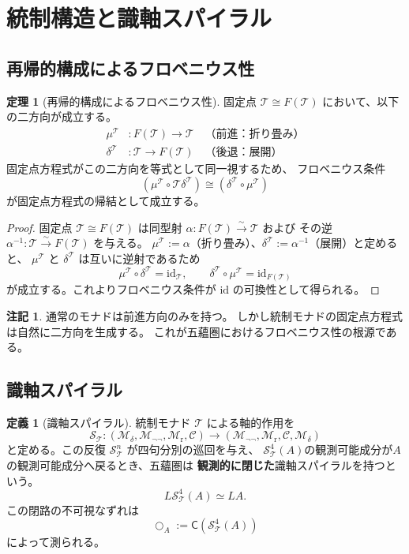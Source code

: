 \documentclass[11pt,a4paper]{ltjsarticle}
\theoremstyle{definition}
\newtheorem{definition}{定義}[section]
\newtheorem{theorem}{定理}[section]
\newtheorem{remark}{注記}[section]
\newcommand{\id}{\mathrm{id}}
\newcommand{\Mdelta}{\mathcal{M}_{\delta}}
\newcommand{\Mneg}{\mathcal{M}_{\neg\neg}}
\newcommand{\Mr}{\mathcal{M}_{\mathrm{r}}}
\newcommand{\Mc}{\mathcal{C}}
\newcommand{\T}{\mathcal{T}}
\newcommand{\SpiralT}{\mathcal{S}_{\mathcal{T}}}
\newcommand{\fold}{\mu}
\newcommand{\unfold}{\delta}
\newcommand{\Residual}{\mathsf{C}}
\begin{document}
\section{統制構造と識軸スパイラル}

\subsection{再帰的構成によるフロベニウス性}

\begin{theorem}[再帰的構成によるフロベニウス性]
固定点 $\T \cong F(\T)$ において、以下の二方向が成立する。
\begin{align}
\fold^\T &: F(\T) \to \T \quad \text{（前進：折り畳み）} \\
\unfold^\T &: \T \to F(\T) \quad \text{（後退：展開）}
\end{align}
固定点方程式がこの二方向を等式として同一視するため、
フロベニウス条件
\begin{equation}
(\fold^\T \circ \T\unfold^\T) \cong (\unfold^\T \circ \fold^\T)
\end{equation}
が固定点方程式の帰結として成立する。
\end{theorem}
\begin{proof}
固定点 $\T \cong F(\T)$ は同型射 $\alpha : F(\T) \xrightarrow{\sim} \T$ および
その逆 $\alpha^{-1} : \T \xrightarrow{\sim} F(\T)$ を与える。
$\fold^\T := \alpha$（折り畳み）、$\unfold^\T := \alpha^{-1}$（展開）と定めると、
$\fold^\T$ と $\unfold^\T$ は互いに逆射であるため
\begin{equation}
\fold^\T \circ \unfold^\T = \id_{\T}, \qquad
\unfold^\T \circ \fold^\T = \id_{F(\T)}
\end{equation}
が成立する。これよりフロベニウス条件が $\id$ の可換性として得られる。
\end{proof}

\begin{remark}
通常のモナドは前進方向のみを持つ。
しかし統制モナドの固定点方程式は自然に二方向を生成する。
これが五蘊圏におけるフロベニウス性の根源である。
\end{remark}

\subsection{識軸スパイラル}

\begin{definition}[識軸スパイラル]
統制モナド $\T$ による軸的作用を
\begin{equation}
\SpiralT : (\Mdelta, \Mneg, \Mr, \Mc) \longrightarrow 
             (\Mneg, \Mr, \Mc, \Mdelta)
\end{equation}
と定める。この反復 $\SpiralT^n$ が四句分別の巡回を与え、
$\SpiralT^4(A)$の観測可能成分が$A$の観測可能成分へ戻るとき、五蘊圏は
\textbf{観測的に閉じた}識軸スパイラルを持つという。
\[
 L\SpiralT^4(A)\simeq LA.
\]
この閉路の不可視なずれは
\[
 \bigcirc_A:=\Residual(\SpiralT^4(A))
\]
によって測られる。
\end{definition}
\end{document}
